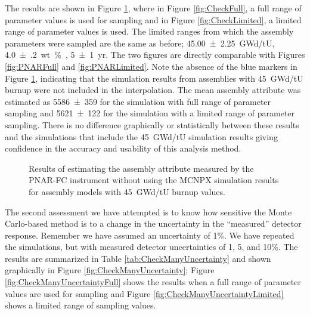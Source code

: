 \documentclass{ansnse}
\begin{document}
The results are shown in Figure \ref{fig:Check}, where in Figure \ref{fig:CheckFull}, a full range of parameter values is used for sampling and in Figure \ref{fig:CheckLimited}, a limited range of parameter values is used.  The limited ranges from which the assembly parameters were sampled are the same as before; \SI{45.00(225)}{GWd/tU}, \SI{4.0(2)}{wt \% }, \SI{5(1)}{yr}.  The two figures are directly comparable with Figures \ref{fig:PNARFull} and \ref{fig:PNARLimited}.  Note the absence of the blue markers in Figure \ref{fig:Check}, indicating that the simulation results from assemblies with \SI{45}{GWd/tU} burnup were not included in the interpolation.  The mean assembly attribute was estimated as \num{5586(359)} for the simulation with full range of parameter sampling and \num{5621(122)} for the simulation with a limited range of parameter sampling.  There is no difference graphically or statistically between these results and the simulations that include the \SI{45}{GWd/tU} simulation results giving confidence in the accuracy and usability of this analysis method.
\begin{figure}[hp!]\centering
     \qquad
    \caption{Results of estimating the assembly attribute measured by the PNAR-FC instrument without using the MCNPX simulation results for assembly models with \SI{45}{GWd/tU} burnup values.}
    \label{fig:Check}
\end{figure}

The second assessment we have attempted is to know how sensitive the Monte Carlo-based method is to a change in the uncertainty in the ``measured'' detector response.  Remember we have assumed an uncertainty of 1\%.  We have repeated the simulations, but with measured detector uncertainties of 1, 5, and 10\%.  The results are summarized in Table \ref{tab:CheckManyUncertainty} and shown graphically in Figure \ref{fig:CheckManyUncertainty}; Figure \ref{fig:CheckManyUncertaintyFull} shows the results when a full range of parameter values are used for sampling and Figure \ref{fig:CheckManyUncertaintyLimited} shows a limited range of sampling values.
\end{document}
